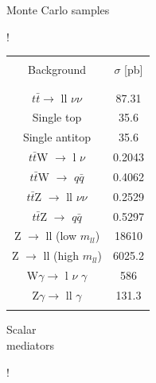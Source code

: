 \documentclass[handout,8 pt]{beamer}
\begin{document}
\begin{frame}{Monte Carlo samples}
\hspace{4pt}
\begin{minipage}[c]{.02\linewidth}
	\begin{exampleblock}{}  \end{exampleblock}
\end{minipage}	
\hspace{8pt}
\begin{minipage}[c]{.28\linewidth}
\begin{table}
\centering
\resizebox{95pt} {!}{
\begin{tabular}{c|c}
& \\
Background & $\sigma$ [pb] \\
& \\
 \hline \hline
 & \\
$t \bar t \rightarrow$ ll $\nu$$\nu$ & 87.31 \\
Single top & 35.6  \\
Single antitop & 35.6 \\
$t \bar t$W $\rightarrow$ l $\nu$ & 0.2043  \\
$t \bar t$W $\rightarrow$ $q \bar q$ & 0.4062 \\
$t \bar t$Z $\rightarrow$ ll $\nu$$\nu$ & 0.2529 \\
$t \bar t$Z $\rightarrow$ $q \bar q$ & 0.5297  \\
Z $\rightarrow$ ll (low $m_{ll}$) & 18610  \\
Z $\rightarrow$ ll (high $m_{ll}$) & 6025.2  \\
W$\gamma \rightarrow$ l $\nu$ $\gamma$ & 586 \\
Z$\gamma \rightarrow$ ll $\gamma$ & 131.3 \\
& \\
\end{tabular}
}
\end{table} 
   	\end{minipage} \hfill
   	\begin{minipage}[c]{.22\linewidth}
	\begin{center}
	\begin{exampleblock}{} \begin{center} Scalar \\ mediators \end{center} \end{exampleblock}
	\end{center}
	\vspace{-8pt}
\begin{table}
\centering
\resizebox{74pt} {!}{
}
\end{table}
\end{minipage}
\end{frame}
\end{document}

